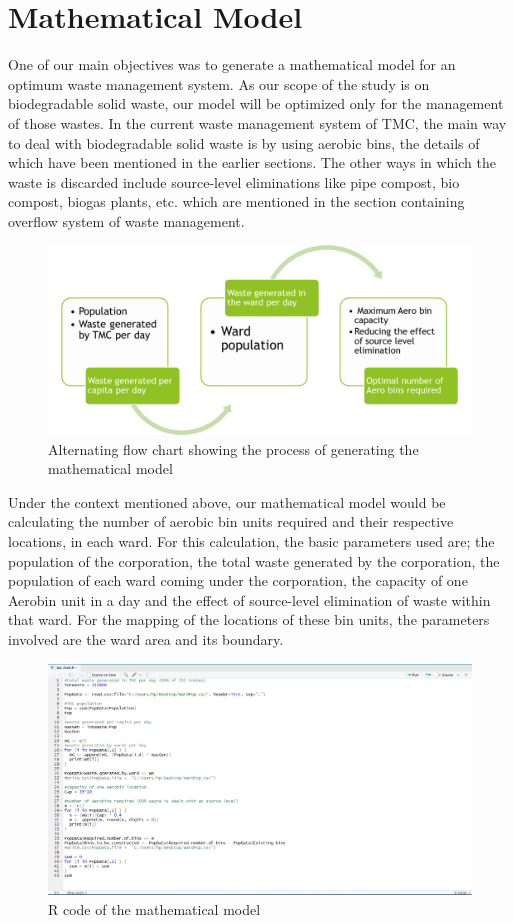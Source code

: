 \documentclass[12pt,a4paper]{  report}
\begin{document}
\chapter{\textbf{Mathematical Model}}
One of our main objectives was to generate a mathematical model for an optimum waste management system. As our scope of the study is on biodegradable solid waste, our model will be optimized only for the management of those wastes. In the current waste management system of TMC, the main way to deal with biodegradable solid waste is by using aerobic bins, the details of which have been mentioned in the earlier sections. The other ways in which the waste is discarded include source-level eliminations like pipe compost, bio compost, biogas plants, etc. which are mentioned in the section containing overflow system of waste management.

\begin{figure}
	\centering
	\includegraphics[width=0.8\linewidth]{mathmod}
	\caption{Alternating flow chart showing the process of generating the mathematical model}
	\label{fig:mathmod}
\end{figure}

Under the context mentioned above, our mathematical model would be calculating the number of aerobic bin units required and their respective locations, in each ward. For this calculation, the basic parameters used are; the population of the corporation, the total waste generated by the corporation, the population of each ward coming under the corporation, the capacity of one Aerobin unit in a day and the effect of source-level elimination of waste within that ward. For the mapping of the locations of these bin units, the parameters involved are the ward area and its boundary.

\begin{figure}
	\centering
	\includegraphics[width=1\linewidth]{Rcode}
	\caption{R code of the mathematical model}
	\label{fig:rcode}
\end{figure}
\end{document}
